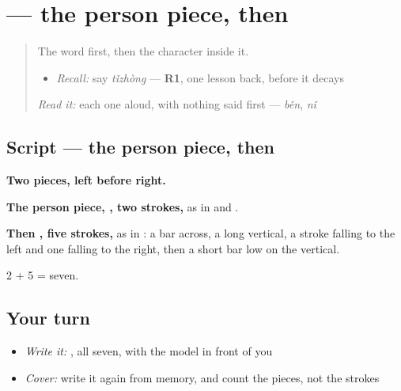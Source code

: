\section[\texorpdfstring{\zh{体} (tǐ)}{体 (tǐ)}]{ — the person piece, then }

\label{lesson:ZH-W230-ti-body}



\begin{quote}
The word first, then the character inside it.

\begin{itemize}
\raggedright
  \item \emph{Recall:} say \emph{tǐzhòng} — \textbf{R1}, one lesson back, before it decays
\end{itemize}

\begin{quote}
 
\end{quote}

\emph{Read it:} each one aloud, with nothing said first — \emph{běn}, \emph{nǐ}
\end{quote}

\subsection*{Script — the person piece, then }

\begin{quote}
\end{quote}

\textbf{Two pieces, left before right.}

\textbf{The person piece, , two strokes,} as in  and .

\textbf{Then , five strokes,} as in : a bar across, a long vertical, a stroke falling to the left and one falling to the right, then a short bar low on the vertical.

2 + 5 = seven.

\subsection*{Your turn}
\begin{itemize}
\raggedright
  \item \emph{Write it:} , all seven, with the model in front of you
  \item \emph{Cover:} write it again from memory, and count the pieces, not the strokes
\end{itemize}


